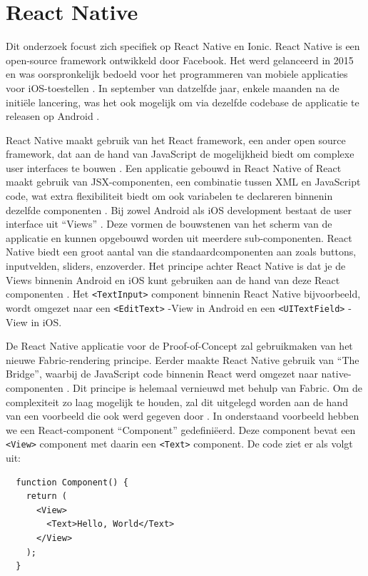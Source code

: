 \section{React Native}
\label{sec:react-native}

Dit onderzoek focust zich specifiek op React Native en Ionic. React Native is een open-source framework ontwikkeld door Facebook. Het werd gelanceerd in 2015 en was oorspronkelijk bedoeld voor het programmeren van mobiele applicaties voor iOS-toestellen \autocite{Bron2, Bron1}. In september van datzelfde jaar, enkele maanden na de initiële lancering, was het ook mogelijk om via dezelfde codebase de applicatie te releasen op Android \autocite{Bron1}.

React Native maakt gebruik van het React framework, een ander open source framework, dat aan de hand van JavaScript de mogelijkheid biedt om complexe user interfaces te bouwen \autocite{Bron17}. Een applicatie gebouwd in React Native of React maakt gebruik van JSX-componenten, een combinatie tussen XML en JavaScript code, wat extra flexibiliteit biedt om ook variabelen te declareren binnenin dezelfde componenten \autocite{Bron2}. Bij zowel Android als iOS development bestaat de user interface uit ``Views'' \autocite{Bron18}. Deze vormen de bouwstenen van het scherm van de applicatie en kunnen opgebouwd worden uit meerdere sub-componenten. React Native biedt een groot aantal van die standaardcomponenten aan zoals buttons, inputvelden, sliders, enzoverder. Het principe achter React Native is dat je de Views binnenin Android en iOS kunt gebruiken aan de hand van deze React componenten \autocite{Bron18}. Het \verb|<TextInput>| component binnenin React Native bijvoorbeeld, wordt omgezet naar een \verb|<EditText>| -View in Android en een \verb|<UITextField>| -View in iOS.

De React Native applicatie voor de Proof-of-Concept zal gebruikmaken van het nieuwe Fabric-rendering principe. Eerder maakte React Native gebruik van ``The Bridge'', waarbij de JavaScript code binnenin React werd omgezet naar native-componenten \autocite{Bron1}. Dit principe is helemaal vernieuwd met behulp van Fabric. Om de complexiteit zo laag mogelijk te houden, zal dit uitgelegd worden aan de hand van een voorbeeld die ook werd gegeven door \autocite{Bron17}. In onderstaand voorbeeld hebben we een React-component ``Component'' gedefiniëerd. Deze component bevat een \verb|<View>| component met daarin een \verb|<Text>| component. De code ziet er als volgt uit:

\begin{mdframed}[backgroundcolor=bg]
  \begin{verbatim}
  function Component() {
    return (
      <View>
        <Text>Hello, World</Text>
      </View>
    );
  }
  \end{verbatim}
\end{mdframed}

